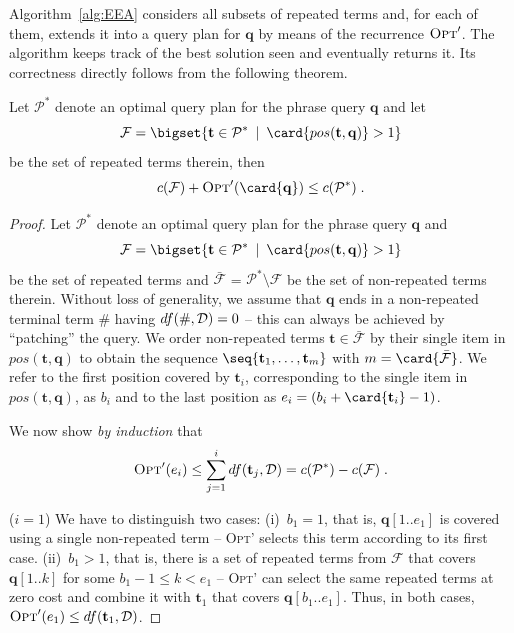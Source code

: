 Algorithm~\ref{alg:EEA} considers all subsets of repeated terms and,
for each of them, extends it into a query plan for $\mathbf{q}$ by
means of the recurrence $\textsc{Opt}'$. The algorithm keeps track of
the best solution seen and eventually returns it. Its correctness
directly follows from the following theorem.

\begin{theorem}
  \label{thm:EEA}
  Let $\mathcal{P}^*$ denote an optimal query plan for the phrase
  query $\mathbf{q}$ and let
  $$\mathcal{F} = \bigset{\mathbf{t} \in \mathcal{P}^* \:\mid\:
    \card{pos(\mathbf{t}, \mathbf{q})} > 1}$$
  be the set of repeated terms therein, then
  $$
  c(\mathcal{F}) + \textsc{Opt}'(\card{\mathbf{q}}) \le c(\mathcal{P}^*)\;.
  $$
\end{theorem}
\begin{proof}
  Let $\mathcal{P}^*$ denote an optimal query plan for the phrase
  query $\mathbf{q}$ and
  $$\mathcal{F} = \bigset{\mathbf{t} \in \mathcal{P}^* \:\mid\:
    \card{pos(\mathbf{t}, \mathbf{q})} > 1}$$
  be the set of repeated terms and $\bar{\mathcal{F}}$ =
  $\mathcal{P}^* \setminus \mathcal{F}$ be the set of non-repeated
  terms therein. Without loss of generality, we assume that
  $\mathbf{q}$ ends in a non-repeated terminal term \textsf{\#} having
  $df(\mbox{\textsf{\#}}, \mathcal{D})=0$ -- this can always be
  achieved by ``patching'' the query. We order non-repeated terms
  $\mathbf{t} \in \bar{\mathcal{F}}$ by their single item in
  $pos(\mathbf{t}, \mathbf{q})$ to obtain the sequence
  $\seq{\mathbf{t}_1, \ldots, \mathbf{t}_{m}}$ with
  $m = \card{\bar{\mathcal{F}}}$. We refer to the first position
  covered by $\mathbf{t}_i$, corresponding to the single item in
  $pos(\mathbf{t}, \mathbf{q})$, as $b_i$ and to the last position as
  $e_i = (b_i + \card{\mathbf{t}_i} - 1)$.

  We now show \emph{by induction} that
  $$
  \textsc{Opt}'(e_i) \le \sum_{j=1}^i df(\mathbf{t}_j, \mathcal{D}) = c(\mathcal{P}^*) - c(\mathcal{F})\;.
  $$

  ($i=1$) We have to distinguish two cases: (i)~$b_1 = 1$, that is,
  $\mathbf{q}[1..e_1]$ is covered using a single non-repeated term --
  \textsc{Opt}' selects this term according to its first
  case. (ii)~$b_1 > 1$, that is, there is a set of repeated terms from
  $\mathcal{F}$ that covers $\mathbf{q}[1..k]$ for some
  $b_1 - 1 \le k < e_1$ -- \textsc{Opt}' can select the same repeated
  terms at zero cost and combine it with $\mathbf{t}_1$ that covers
  $\mathbf{q}[b_1..e_1]$. Thus, in both cases,
  $\textsc{Opt}'(e_1) \le df(\mathbf{t}_1, \mathcal{D})$.



\end{proof}
